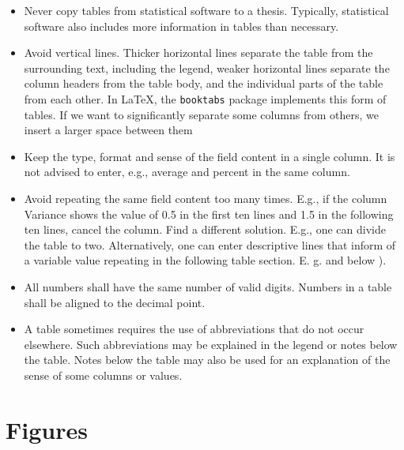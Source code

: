 \begin{itemize} %

\item Never copy tables from statistical software to a thesis. Typically, 
statistical software also includes more information in tables than necessary.

\item Avoid vertical lines. Thicker horizontal lines separate the table from the 
surrounding text, including the legend, weaker horizontal lines separate the 
column headers from the table body, and the individual parts of the table from 
each other. In \LaTeX, the \texttt{booktabs} package implements this form of 
tables. If we want to significantly separate some columns from others, we insert 
a larger space between them

\item Keep the type, format and sense of the field content in a single column. 
It is not advised to enter, e.g., average and percent in the same column.

\item Avoid repeating the same field content too many times. E.g., if the column 
Variance shows the value of 0.5 in the first ten lines and 1.5 in the following 
ten lines, cancel the column. Find a different solution. E.g., one can divide 
the table to two. Alternatively, one can enter descriptive lines that inform of 
a variable value repeating in the following table section. E. g.
\emph{} and below \emph{}).

\item All numbers shall have the same number of valid digits. Numbers in a table 
shall be aligned to the decimal point.

\item A table sometimes requires the use of abbreviations that do not occur 
elsewhere. Such abbreviations may be explained in the legend or notes below the 
table. Notes below the table may also be used for an explanation of the sense of 
some columns or values.

\end{itemize}


\section{Figures}

